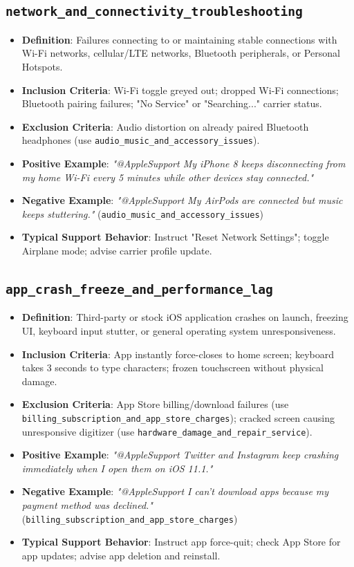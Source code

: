 \documentclass[11pt,a4paper]{article}
\begin{document}
\subsection{\texttt{network\_and\_connectivity\_troubleshooting}}
\begin{itemize}[leftmargin=*]
    \item \textbf{Definition}: Failures connecting to or maintaining stable connections with Wi-Fi networks, cellular/LTE networks, Bluetooth peripherals, or Personal Hotspots.
    \item \textbf{Inclusion Criteria}: Wi-Fi toggle greyed out; dropped Wi-Fi connections; Bluetooth pairing failures; "No Service" or "Searching..." carrier status.
    \item \textbf{Exclusion Criteria}: Audio distortion on already paired Bluetooth headphones (use \texttt{audio\_music\_and\_accessory\_issues}).
    \item \textbf{Positive Example}: \textit{"@AppleSupport My iPhone 8 keeps disconnecting from my home Wi-Fi every 5 minutes while other devices stay connected."}
    \item \textbf{Negative Example}: \textit{"@AppleSupport My AirPods are connected but music keeps stuttering."} (\texttt{audio\_music\_and\_accessory\_issues})
    \item \textbf{Typical Support Behavior}: Instruct "Reset Network Settings"; toggle Airplane mode; advise carrier profile update.
\end{itemize}

\subsection{\texttt{app\_crash\_freeze\_and\_performance\_lag}}
\begin{itemize}[leftmargin=*]
    \item \textbf{Definition}: Third-party or stock iOS application crashes on launch, freezing UI, keyboard input stutter, or general operating system unresponsiveness.
    \item \textbf{Inclusion Criteria}: App instantly force-closes to home screen; keyboard takes 3 seconds to type characters; frozen touchscreen without physical damage.
    \item \textbf{Exclusion Criteria}: App Store billing/download failures (use \texttt{billing\_subscription\_and\_app\_store\_charges}); cracked screen causing unresponsive digitizer (use \texttt{hardware\_damage\_and\_repair\_service}).
    \item \textbf{Positive Example}: \textit{"@AppleSupport Twitter and Instagram keep crashing immediately when I open them on iOS 11.1."}
    \item \textbf{Negative Example}: \textit{"@AppleSupport I can't download apps because my payment method was declined."} (\texttt{billing\_subscription\_and\_app\_store\_charges})
    \item \textbf{Typical Support Behavior}: Instruct app force-quit; check App Store for app updates; advise app deletion and reinstall.
\end{itemize}
\end{document}
